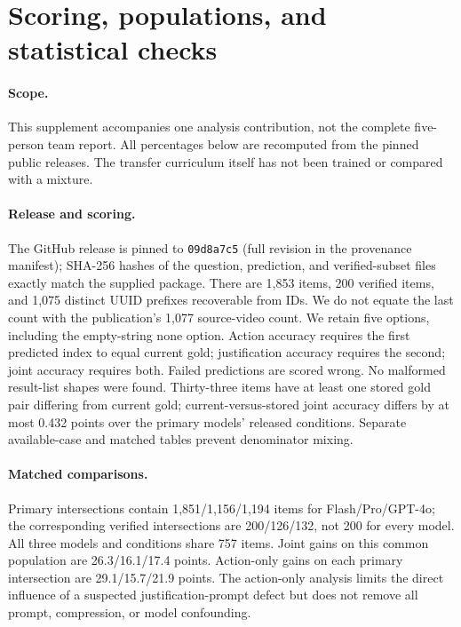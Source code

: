\section{Scoring, populations, and statistical checks}
\paragraph{Scope.} This supplement accompanies one analysis contribution, not the complete five-person team report. All percentages below are recomputed from the pinned public releases. The transfer curriculum itself has not been trained or compared with a mixture.

\paragraph{Release and scoring.} The GitHub release is pinned to \texttt{09d8a7c5} (full revision in the provenance manifest); SHA-256 hashes of the question, prediction, and verified-subset files exactly match the supplied package. There are 1,853 items, 200 verified items, and 1,075 distinct UUID prefixes recoverable from IDs. We do not equate the last count with the publication's 1,077 source-video count. We retain five options, including the empty-string none option. Action accuracy requires the first predicted index to equal current gold; justification accuracy requires the second; joint accuracy requires both. Failed predictions are scored wrong. No malformed result-list shapes were found. Thirty-three items have at least one stored gold pair differing from current gold; current-versus-stored joint accuracy differs by at most 0.432 points over the primary models' released conditions. Separate available-case and matched tables prevent denominator mixing.

\paragraph{Matched comparisons.} Primary intersections contain 1,851/1,156/1,194 items for Flash/Pro/GPT-4o; the corresponding verified intersections are 200/126/132, not 200 for every model. All three models and conditions share 757 items. Joint gains on this common population are 26.3/16.1/17.4 points. Action-only gains on each primary intersection are 29.1/15.7/21.9 points. The action-only analysis limits the direct influence of a suspected justification-prompt defect but does not remove all prompt, compression, or model confounding.

